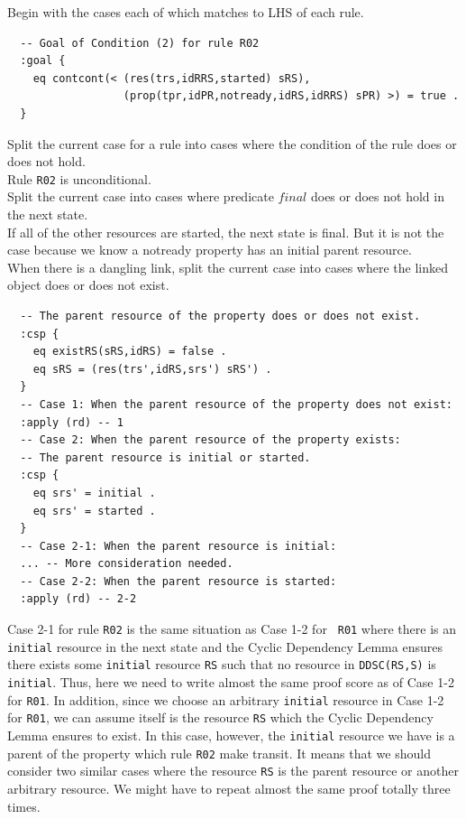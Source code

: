 \documentclass[12pt]{report}
\newcommand{\stt}[1]{{\small{\tt {#1}}}}
\begin{document}
 Begin with the cases each of which matches to
LHS of each rule.
\small
\begin{verbatim}
  -- Goal of Condition (2) for rule R02
  :goal {
    eq contcont(< (res(trs,idRRS,started) sRS),
                  (prop(tpr,idPR,notready,idRS,idRRS) sPR) >) = true .
  }
\end{verbatim}
\normalsize
 Split the current case for a rule into
cases where the condition of the rule does or does not hold. \\
Rule {\tt R02} is unconditional.\\
 Split the current case into cases where
predicate $final$ does or does not hold in the next state.\\
If all of the other resources are started, the next state is final.
But it is not the case because we know a notready property has
an initial parent resource. \\
 When there is a dangling link, split the
current case into cases where the linked object does or does not
exist.
\small
\begin{verbatim}
  -- The parent resource of the property does or does not exist.
  :csp {
    eq existRS(sRS,idRS) = false .
    eq sRS = (res(trs',idRS,srs') sRS') .
  }
  -- Case 1: When the parent resource of the property does not exist:
  :apply (rd) -- 1
  -- Case 2: When the parent resource of the property exists:
  -- The parent resource is initial or started.
  :csp {
    eq srs' = initial .
    eq srs' = started .
  }
  -- Case 2-1: When the parent resource is initial:
  ... -- More consideration needed.
  -- Case 2-2: When the parent resource is started:
  :apply (rd) -- 2-2
\end{verbatim}
\normalsize
Case 2-1 for rule {\tt R02} is the same situation as Case 1-2 for {\tt
  R01} where there is an {\tt initial} resource in the next state and
the Cyclic Dependency Lemma ensures there exists some {\tt initial}
resource {\tt RS} such that no resource in \stt{DDSC(RS,S)} is {\tt
  initial}. Thus, here we need to write almost the same proof score as
of Case 1-2 for {\tt R01}. In addition, since we choose an arbitrary
{\tt initial} resource in Case 1-2 for {\tt R01}, we can assume itself
is the resource {\tt RS} which the Cyclic Dependency Lemma ensures to
exist. In this case, however, the {\tt initial} resource we have is
a parent of the property which rule {\tt R02} make transit. It means
that we should consider two similar cases where the resource {\tt RS}
is the parent resource or another arbitrary resource. We might have 
to repeat almost the same proof totally three times.
\end{document}
